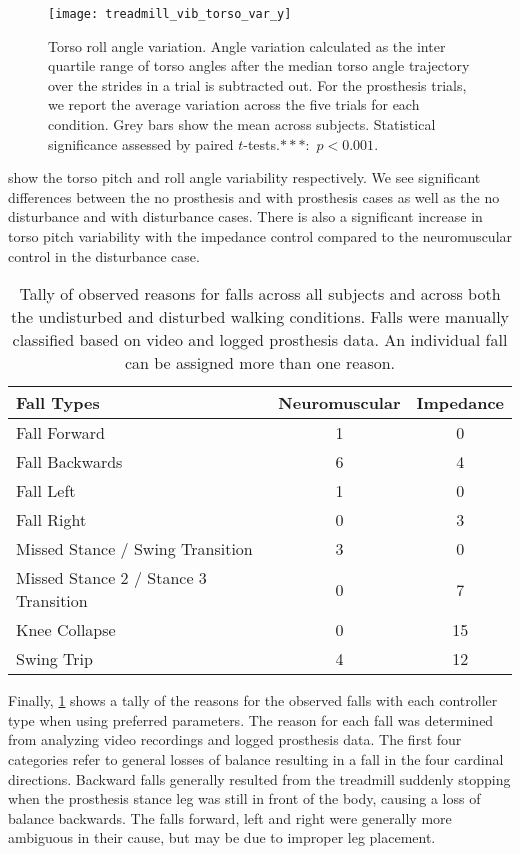 \begin{figure}[t]
    \centering 
    \texttt{[image: treadmill\_vib\_torso\_var\_y]}
    \caption{Torso roll angle variation. Angle variation calculated as the inter
    quartile range of torso angles after the median torso angle trajectory over
    the strides in a trial is subtracted out. For the prosthesis trials, we
    report the average variation across the five trials for each condition.
    Grey bars show the mean across subjects.  Statistical significance assessed
    by paired $t$-tests.$***$:~$p < 0.001$.}\label{fig:treadmill_exp_torso_var_y}
\end{figure}

 show the
torso pitch and roll angle variability respectively. We see significant
differences between the no prosthesis and with prosthesis cases as well as the
no disturbance and with disturbance cases. There is also a significant increase
in torso pitch variability with the impedance control compared to the
neuromuscular control in the disturbance case.

\begin{table}[t]
  \begin{center}
    \begin{tabular}{lcc}
      Fall Types & Neuromuscular & Impedance \\
      \midrule
      Fall Forward &  1 &  0 \\
      Fall Backwards &  6 &  4 \\
      Fall Left &  1 &  0 \\
      Fall Right &  0 &  3 \\
      Missed Stance / Swing Transition &  3 &  0 \\
      Missed Stance 2 / Stance 3 Transition &  0 &  7 \\
      Knee Collapse & 0 & 15 \\
      Swing Trip & 4 & 12 \\
    \end{tabular}
  \end{center}
  \caption{Tally of observed reasons for falls across all subjects and across
  both the undisturbed and disturbed walking conditions. Falls were manually
  classified based on video and logged prosthesis data. An individual fall can
  be assigned more than one reason.}\label{tab:treadmill_exp_fall_reasons}
\end{table}
Finally, \cref{tab:treadmill_exp_fall_reasons} shows a tally of the reasons for
the observed falls with each controller type when using preferred parameters.
The reason for each fall was determined from analyzing video recordings and
logged prosthesis data. The first four categories refer to general losses of
balance resulting in a fall in the four cardinal directions. Backward falls
generally resulted from the treadmill suddenly stopping when the prosthesis
stance leg was still in front of the body, causing a loss of balance backwards.
The falls forward, left and right were generally more ambiguous in their cause,
but may be due to improper leg placement. 

